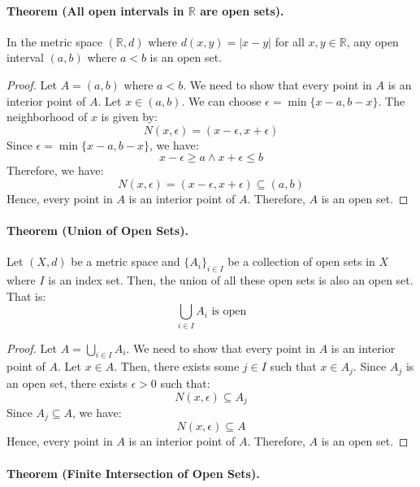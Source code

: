 \documentclass[openany]{book}
\numberwithin{equation}{section}
\begin{document}
\paragraph{Theorem (All open intervals in $\mathbb{R}$ are open sets).}

    In the metric space $(\mathbb{R}, d)$ where $d(x, y) = |x - y|$ for all $x, y \in \mathbb{R}$, any open interval $(a, b)$ where $a < b$ is an open set.
\par
\begin{proof}
    Let $A = (a, b)$ where $a < b$. We need to show that every point in $A$ is an interior point of $A$. Let $x \in (a, b)$. We can choose $\epsilon = \min\{x - a, b - x\}$. The neighborhood of $x$ is given by:
    $$N(x, \epsilon) = (x - \epsilon, x + \epsilon)$$
    Since $\epsilon = \min\{x - a, b - x\}$, we have:
    $$x - \epsilon \geq a \wedge x + \epsilon \leq b$$
    Therefore, we have:
    $$N(x, \epsilon) = (x - \epsilon, x + \epsilon) \subseteq (a, b)$$
    Hence, every point in $A$ is an interior point of $A$. Therefore, $A$ is an open set.
\end{proof}
\paragraph{Theorem (Union of Open Sets).}

    Let $(X, d)$ be a metric space and $\{A_i\}_{i \in I}$ be a collection of open sets in $X$ where $I$ is an index set. Then, the union of all these open sets is also an open set. That is:
    $$\bigcup_{i \in I} A_i \text{ is open}$$
\par
\begin{proof}
    Let $A = \bigcup_{i \in I} A_i$. We need to show that every point in $A$ is an interior point of $A$. Let $x \in A$. Then, there exists some $j \in I$ such that $x \in A_j$. Since $A_j$ is an open set, there exists $\epsilon > 0$ such that:
    $$N(x, \epsilon) \subseteq A_j$$
    Since $A_j \subseteq A$, we have:
    $$N(x, \epsilon) \subseteq A$$
    Hence, every point in $A$ is an interior point of $A$. Therefore, $A$ is an open set.
\end{proof}
\paragraph{Theorem (Finite Intersection of Open Sets).}
\end{document}
